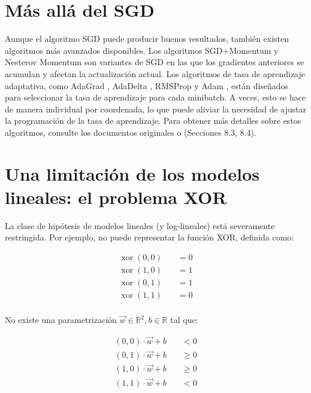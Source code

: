 \section{Más allá del SGD}
Aunque el algoritmo SGD puede producir buenos resultados, también existen algoritmos más avanzados disponibles. Los algoritmos SGD+Momentum \cite{polyak1964some} y Nesterov Momentum \cite{nesterov2018lectures,sutskever2013importance} son variantes de SGD en las que los gradientes anteriores se acumulan y afectan la actualización actual. Los algoritmos de tasa de aprendizaje adaptativa, como AdaGrad \cite{duchi2011adaptive}, AdaDelta \cite{zeiler2012adadelta}, RMSProp \cite{tieleman2012lecture} y Adam \cite{kingma2014adam}, están diseñados para seleccionar la tasa de aprendizaje para cada minibatch. A veces, esto se hace de manera individual por coordenada, lo que puede aliviar la necesidad de ajustar la programación de la tasa de aprendizaje. Para obtener más detalles sobre estos algoritmos, consulte los documentos originales o \cite{goodfellow2016deep} (Secciones 8.3, 8.4).



\section{Una limitación de los modelos lineales: el problema XOR}
La clase de hipótesis de modelos lineales (y log-lineales) está severamente restringida. Por ejemplo, no puede representar la función XOR, definida como:

\begin{equation}
\begin{split}
\operatorname{xor}(0,0) \quad & = 0 \\
\operatorname{xor}(1,0) \quad & = 1 \\
\operatorname{xor}(0,1) \quad & = 1 \\
\operatorname{xor}(1,1) \quad & = 0 \\
\end{split}
\end{equation}

No existe una parametrización $\vec{w} \in \mathbb{R}^2, b \in \mathbb{R}$ tal que:

\begin{equation}
\begin{split}
(0,0) \cdot \vec{w} + b \quad & < 0 \\
(0,1) \cdot \vec{w} + b \quad & \geq 0 \\
(1,0) \cdot \vec{w} + b \quad & \geq 0 \\
(1,1) \cdot \vec{w} + b \quad & < 0 \\
\end{split}
\end{equation}

